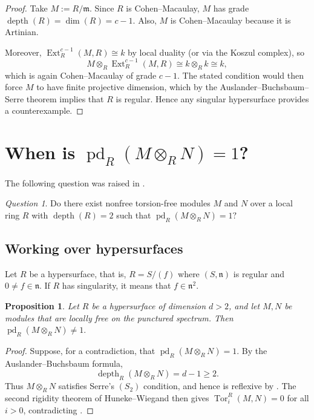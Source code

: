 \documentclass[11.05pt,a4paper]{amsart}
\newtheorem{proposition}[theorem]{Proposition}
\theoremstyle{definition}
\theoremstyle{remark}
\newtheorem{question}[theorem]{Question}
\newcommand{\pd}{\operatorname{pd}}
\newcommand{\Ext}{\operatorname{Ext}}
\newcommand{\Tor}{\operatorname{Tor}}
\newcommand{\depth}{\operatorname{depth}}
\begin{document}
\begin{proof}
	Take $M := R/\mathfrak{m}$. Since $R$ is Cohen--Macaulay, $M$ has grade $\depth(R)=\dim(R) = c-1$. Also, $M$ is Cohen--Macaulay because it is Artinian.
	
	Moreover, $\Ext^{c-1}_R(M,R) \cong k$ by local duality (or via the Koszul complex), so
	\[
	M\otimes_R \Ext^{c-1}_R(M,R) \cong k \otimes_R k \cong k,
	\]
	which is again Cohen--Macaulay of grade $c-1$. The stated condition would then force $M$ to have finite projective dimension, which by the Auslander--Buchsbaum--Serre theorem implies that $R$ is regular. Hence any singular hypersurface provides a counterexample.
\end{proof}

\medskip

\section{When is $\pd_R(M\otimes_R N)=1$?}

The following question was raised in \cite[Question 3.3]{celp}.

\begin{question}
	Do there exist nonfree torsion-free modules $M$ and $N$ over a local ring $R$ with $\depth(R)=2$ such that
	\(
	\pd_R(M\otimes_R N)=1?
	\)
\end{question}

\subsection{Working over hypersurfaces}

Let $R$ be a hypersurface, that is, $R=S/(f)$ where $(S,\mathfrak n)$ is regular and $0\ne f\in\mathfrak n$.
If $R$ has singularity, it means that $f\in\mathfrak n^2$.
\begin{proposition}
	Let $R$ be a hypersurface of dimension $d>2$, and let $M,N$ be modules that are locally free on the punctured spectrum. Then
	\(
	\pd_R(M\otimes_R N)\ne 1.
	\)
\end{proposition}

\begin{proof}
	Suppose, for a contradiction, that $\pd_R(M\otimes_R N)=1$. By the Auslander–Buchsbaum formula,
	\[
	\depth_R(M\otimes_R N)=d-1\ge2.
	\]
	Thus $M\otimes_R N$ satisfies Serre's $(S_2)$ condition, and hence is reflexive by \cite[3.6]{syz}. The second rigidity theorem of Huneke–Wiegand \cite[2.7]{tensor} then gives $\Tor_i^R(M,N)=0$ for all $i>0$, contradicting \cite[1.5]{celp}.
\end{proof}
\end{document}
